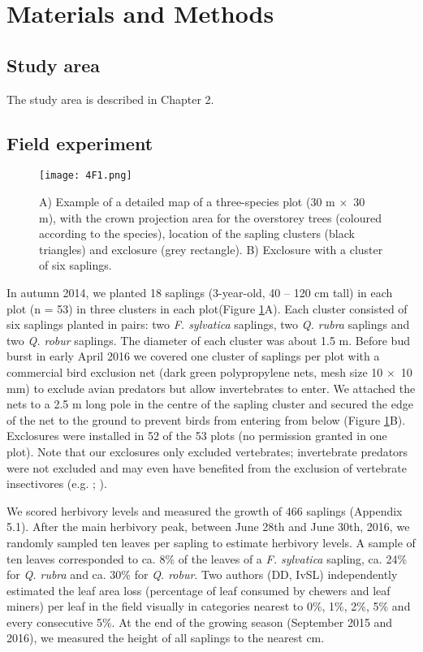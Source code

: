 \documentclass[b5paper,10pt]{book} %
\begin{document}
	\section{Materials and Methods}
	\subsection{Study area}
	
	The study area is described in Chapter 2.

	\subsection{Field experiment}

	\begin{figure}[t!]
		\begin{center}
			\texttt{[image: 4F1.png]}
		\end{center}
			\caption{A) Example of a detailed map of a three-species plot (30 m $\times$\ 30 m), with the crown projection area for the overstorey trees (coloured according to the species), location of the sapling clusters (black triangles) and exclosure (grey rectangle). B) Exclosure with a cluster of six saplings. \label{Fig4.1}}
	\end{figure}

	In autumn 2014, we planted 18 saplings (3-year-old, 40 -- 120 cm tall) in each plot (n = 53) in three clusters in each plot(Figure \ref{Fig4.1}A). Each cluster consisted of six saplings planted in pairs: two \textit{F. sylvatica} saplings, two \textit{Q. rubra} saplings and two \textit{Q. robur} saplings. The diameter of each cluster was about 1.5 m. Before bud burst in early April 2016 we covered one cluster of saplings per plot with a commercial bird exclusion net (dark green polypropylene nets, mesh size 10 $\times$\ 10 mm) to exclude avian predators but allow invertebrates to enter. We attached the nets to a 2.5 m long pole in the centre of the sapling cluster and secured the edge of the net to the ground to prevent birds from entering from below (Figure \ref{Fig4.1}B). Exclosures were installed in 52 of the 53 plots (no permission granted in one plot). Note that our exclosures only excluded vertebrates; invertebrate predators were not excluded and may even have benefited from the exclusion of vertebrate insectivores (e.g. \citealt{Grass2017}; \citealt{Bosc2018}).

	We scored herbivory levels and measured the growth of 466 saplings (Appendix 5.1). After the main herbivory peak, between June 28th and June 30th, 2016, we randomly sampled ten leaves per sapling to estimate herbivory levels. A sample of ten leaves corresponded to ca. 8\% of the leaves of a \textit{F. sylvatica} sapling, ca. 24\% for \textit{Q. rubra} and ca. 30\% for \textit{Q. robur}. Two authors (DD, IvSL) independently estimated the leaf area loss (percentage of leaf consumed by chewers and leaf miners) per leaf in the field visually in categories nearest to 0\%, 1\%, 2\%, 5\% and every consecutive 5\%. At the end of the growing season (September 2015 and 2016), we measured the height of all saplings to the nearest cm. 
\end{document}
